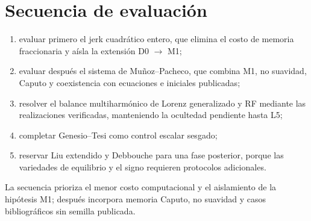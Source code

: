 \section{Secuencia de evaluación}
\label{sec:candidate-order}

\begin{enumerate}
 \item evaluar primero el jerk cuadrático entero, que elimina el costo de
 memoria fraccionaria y aísla la extensión D0 \(\to\) M1;
 \item evaluar después el sistema de Muñoz--Pacheco, que combina M1,
 no suavidad, Caputo y coexistencia con ecuaciones e iniciales publicadas;
 \item resolver el balance multiharmónico de Lorenz generalizado y RF mediante
 las realizaciones verificadas, manteniendo la ocultedad pendiente hasta L5;
 \item completar Genesio--Tesi como control escalar sesgado;
 \item reservar Liu extendido y Debbouche para una fase posterior, porque las
 variedades de equilibrio y el signo requieren protocolos adicionales.
\end{enumerate}

La secuencia prioriza el menor costo computacional y el aislamiento de la
hipótesis M1; después incorpora memoria Caputo, no suavidad y casos
bibliográficos sin semilla publicada.
